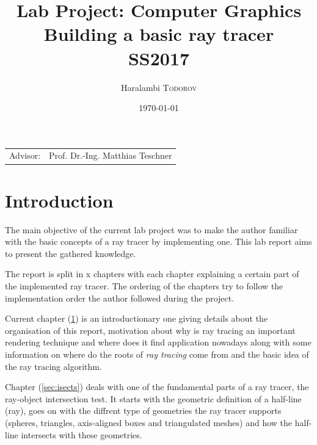 \documentclass{article}
\title{Lab Project: Computer Graphics \\ Building a basic ray tracer \\ SS2017} %
\author{Haralambi \textsc{Todorov}} %
\date{\today} %
\begin{document}
\maketitle %

\begin{center}
\begin{tabular}{l r}
Advisor: & Prof. Dr.-Ing. Matthias Teschner %
\end{tabular}
\end{center}



\section{Introduction}
\label{sec:intro}

The main objective of the current lab project was to make the author familiar with the basic concepts of a ray tracer by implementing one. This lab report aims to present the gathered knowledge.

\vspace*{\baselineskip}

The report is split in x chapters with each chapter explaining a certain part of the implemented ray tracer. The ordering of the chapters try to follow the implementation order the author followed during the project. 

\vspace*{\baselineskip}

Current chapter (\ref{sec:intro}) is an introductionary one giving details about the organisation of this report, motivation about why is ray tracing an important rendering technique and where does it find application nowadays along with some information on where do the roots of \textit{ray tracing} come from and the basic idea of the ray tracing algorithm.

\vspace*{\baselineskip}

Chapter (\ref{sec:isects}) deals with one of the fundamental parts of a ray tracer, the ray-object intersection test. It starts with the geometric definition of a half-line (ray), goes on with the diffrent type of geometries the ray tracer supports (spheres, triangles, axis-aligned boxes and triangulated meshes) and how the half-line intersects with these geometries.
\end{document}

